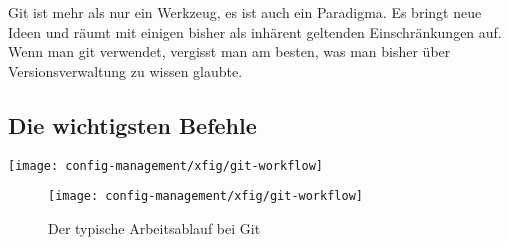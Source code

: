 Git ist mehr als nur ein Werkzeug, es ist auch ein Paradigma.
Es bringt neue Ideen und
räumt mit einigen bisher als inhärent geltenden Einschränkungen auf.
Wenn man git verwendet, vergisst man am besten, was man bisher über
Versionsverwaltung zu wissen glaubte.
%
\newslide
\subsection{Die wichtigsten Befehle}
\ifslides
\begin{center}
  \texttt{[image: config-management/xfig/git-workflow]}
\end{center}
\else
\begin{figure}[H]
\centering
  \texttt{[image: config-management/xfig/git-workflow]}
\caption{Der typische Arbeitsablauf bei Git}
\end{figure}
\fi
